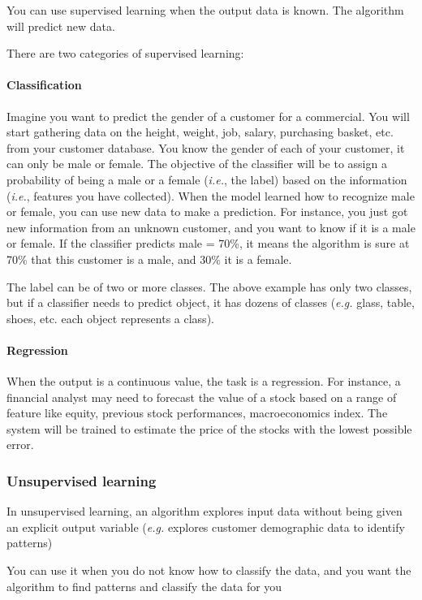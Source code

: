 You can use supervised learning when the output data is known. The algorithm will predict new data.

There are two categories of supervised learning:
\paragraph{Classification}
Imagine you want to predict the gender of a customer for a commercial. You will start gathering data on the height, weight, job, salary, purchasing basket, etc. from your customer database. You know the gender of each of your customer, it can only be male or female. The objective of the classifier will be to assign a probability of being a male or a female (\textit{i.e.}, the label) based on the information (\textit{i.e.}, features you have collected). When the model learned how to recognize male or female, you can use new data to make a prediction. For instance, you just got new information from an unknown customer, and you want to know if it is a male or female. If the classifier predicts male = 70\%, it means the algorithm is sure at 70\% that this customer is a male, and 30\% it is a female.

The label can be of two or more classes. The above example has only two classes, but if a classifier needs to predict object, it has dozens of classes (\textit{e.g.} glass, table, shoes, etc. each object represents a class).

\paragraph{Regression}
When the output is a continuous value, the task is a regression. For instance, a financial analyst may need to forecast the value of a stock based on a range of feature like equity, previous stock performances, macroeconomics index. The system will be trained to estimate the price of the stocks with the lowest possible error.

\subsubsection{Unsupervised learning}
In unsupervised learning, an algorithm explores input data without being given an explicit output variable (\textit{e.g.} explores customer demographic data to identify patterns)

You can use it when you do not know how to classify the data, and you want the algorithm to find patterns and classify the data for you


